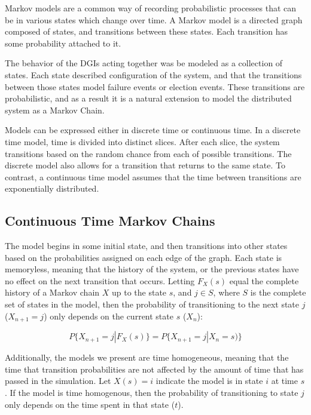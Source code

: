 Markov models are a common way of recording probabilistic processes that can be in various states which change over time.
A Markov model is a directed graph composed of states, and transitions between these states.
Each transition has some probability attached to it.

The behavior of the DGIs acting together was be modeled as a collection of states.
Each state described configuration of the system, and that the transitions between those states model failure events or election events.
These transitions are probabilistic, and as a result it is a natural extension to model the distributed system as a Markov Chain.

Models can be expressed either in discrete time or continuous time.
In a discrete time model, time is divided into distinct slices.
After each slice, the system transitions based on the random chance from each of possible transitions.
The discrete model also allows for a transition that returns to the same state.
To contrast, a continuous time model assumes that the time between transitions are exponentially distributed. 

\subsection{Continuous Time Markov Chains}

The model begins in some initial state, and then transitions into other states based on the probabilities assigned on each edge of the graph.
Each state is memoryless, meaning that the history of the system, or the previous states have no effect on the next transition that occurs.
Letting $F_X(s)$ equal the complete history of a Markov chain $X$ up to the state $s$, and $j \in S$, where $S$ is the complete set of states in the model, then the probability of transitioning to the next state $j$ ($X_{n+1}=j$) only depends on the current state $s$ ($X_{n}$): \cite{MARKOV2} 

\begin{equation}
P\{ X_{n+1}=j | F_{X}(s) \} = P\{ X_{n+1}=j | X_{n} = s) \}
\end{equation}


Additionally, the models we present are time homogeneous, meaning that the time that transition probabilities are not affected by the amount of time that has passed in the simulation.
Let $X(s) = i$ indicate the model is in state $i$ at time $s$.
If the model is time homogenous, then the probability of transitioning to state $j$ only depends on the time spent in that state ($t$).

